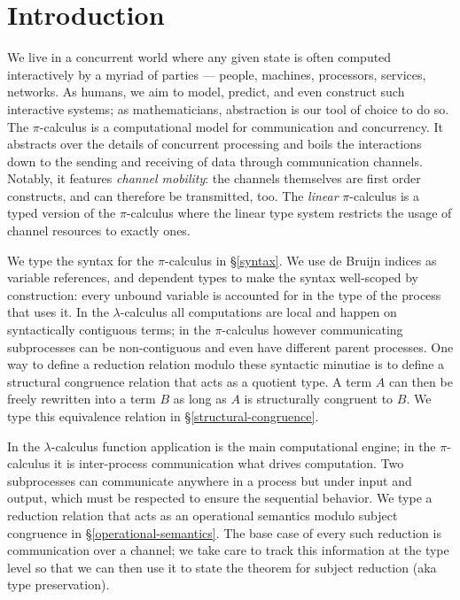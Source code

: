 \documentclass[a4paper,UKenglish,cleveref, autoref, thm-restate,authorcolumns]{lipics-v2019}
\theoremstyle{definition}
\newcommand{\lambdacalc}{$\lambda$-calculus}
\newcommand{\picalc}{$\pi$-calculus}
\begin{document}
\section{Introduction}
We live in a concurrent world where any given state is often computed interactively by a myriad of parties --- people, machines, processors, services, networks.
As humans, we aim to model, predict, and even construct such interactive systems; as mathematicians, abstraction is our tool of choice to do so.
The \picalc{} \cite{MilnerPW92,Milner99,Sangio01} is a computational model for communication and concurrency. It abstracts over the details of concurrent processing and boils the interactions down to the sending and receiving of data through communication channels.
Notably, it features \emph{channel mobility}: the channels themselves are first order constructs, and can therefore be transmitted, too.
The \emph{linear} \picalc{} \cite{KPT96,Sangio01} is a typed version of the \picalc{} where the linear type system restricts the usage of channel resources to exactly ones.

We type the syntax for the \picalc{} in \S \ref{syntax}.
We use de Bruijn indices \cite{} as variable references, and dependent types to make the syntax well-scoped by construction: every unbound variable is accounted for in the type of the process that uses it.
In the \lambdacalc{} all computations are local and happen on syntactically contiguous terms; in the \picalc{} however communicating subprocesses can be non-contiguous and even have different parent processes.
One way to define a reduction relation modulo these syntactic minutiae is to define a structural congruence \cite{} relation that acts as a quotient type.
A term $A$ can then be freely rewritten into a term $B$ as long as $A$ is structurally congruent to $B$.
We type this equivalence relation in \S \ref{structural-congruence}.

In the \lambdacalc{} function application is the main computational engine; in the \picalc{} it is inter-process communication what drives computation.
Two subprocesses can communicate anywhere in a process but under input and output, which must be respected to ensure the sequential behavior.
We type a reduction relation that acts as an operational semantics modulo subject congruence in \S \ref{operational-semantics}.
The base case of every such reduction is communication over a channel; we take care to track this information at the type level so that we can then use it to state the theorem for subject reduction (aka type preservation).
\end{document}
